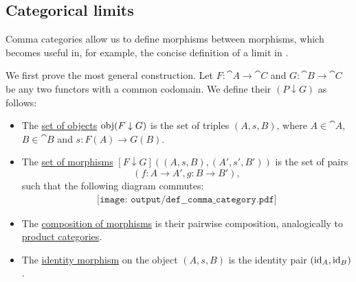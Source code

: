 \subsection{Categorical limits}\label{subsec:categorical_limits}

\begin{definition}\label{def:comma_category}
  Comma categories allow us to define morphisms between morphisms, which becomes useful in, for example, the concise definition of a limit in .

  \begin{thmenum}
     We first prove the most general construction. Let \( F: \cat{A} \to \cat{C} \) and \( G: \cat{B} \to \cat{C} \) be any two functors with a common codomain. We define their  \( (P \downarrow G) \) as follows:

    \begin{itemize}
      \item The \hyperref[def:category/objects]{set of objects} \( \operatorname{obj}(F \downarrow G) \) is the set of triples \( (A, s, B) \), where \( A \in \cat{A} \), \( B \in \cat{B} \) and \( s: F(A) \to G(B) \).

      \item The \hyperref[def:category/morphisms]{set of morphisms} \( [F \downarrow G]((A, s, B), (A', s', B')) \) is the set of pairs
      \begin{equation*}
        (f: A \to A', g: B \to B'),
      \end{equation*}
      such that the following diagram commutes:
      \begin{equation}\label{eq:def:comma_category/variable}
        \begin{aligned}
          \texttt{[image: output/def\_\_comma\_category.pdf]}
        \end{aligned}
      \end{equation}

      \item The \hyperref[def:category/composition]{composition of morphisms} is their pairwise composition, analogically to \hyperref[def:product_category]{product categories}.

      \item The \hyperref[def:category/identity]{identity morphism} on the object \( (A, s, B) \) is the identity pair \( (\operatorname{id}_A, \operatorname{id}_B) \).
    \end{itemize}


\end{thmenum}
\end{definition}
